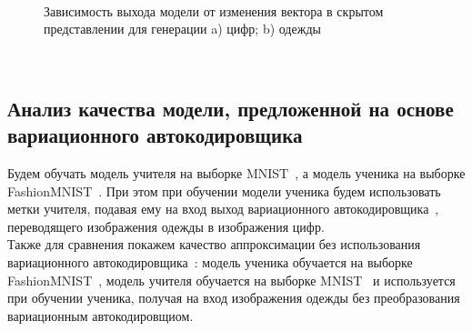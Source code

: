 \begin{figure}[h!t]\center
{}
\qquad
{}\\
\caption{Зависимость выхода модели от изменения вектора в скрытом представлении для генерации a) цифр; b) одежды}
\end{figure}\\

\subsection{Анализ качества модели, предложенной на основе вариационного автокодировщика}
Будем обучать модель учителя на выборке MNIST~\cite{MNIST}, а модель ученика на выборке FashionMNIST~\cite{FMNIST}. При этом при обучении модели ученика будем использовать метки учителя, подавая ему на вход выход вариационного автокодировщика~\cite{VAE}, переводящего изображения одежды в изображения цифр.\\
Также для сравнения покажем качество аппроксимации без использования вариационного автокодировщика~\cite{VAE}: модель ученика обучается на выборке FashionMNIST~\cite{FMNIST}, модель учителя обучается на выборке MNIST~\cite{MNIST} и используется при обучении ученика, получая на вход изображения одежды без преобразования вариационным автокодировщиом.\\

